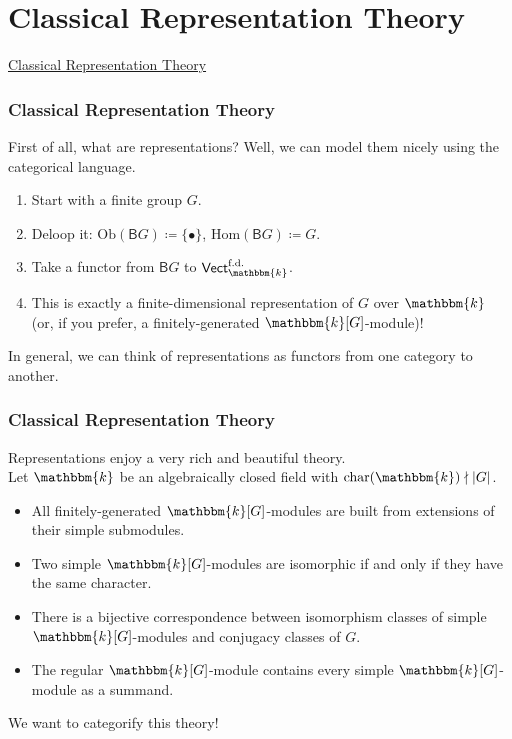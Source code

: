 \documentclass{beamer}
\DeclarePairedDelimiter{\abs}{\lvert}{\rvert}
\newcommand{\obset}{\mathrm{Ob}}
\newcommand{\homset}{\mathrm{Hom}}
\newcommand{\textcat}[1]{\mathrm{\textsf{#1}}}
\begin{document}

\section{Classical Representation Theory}

\begin{frame}
\centerline{\huge\textcolor{structure}{\underline{Classical Representation Theory}}}
\end{frame}

\begin{frame}
\frametitle{Classical Representation Theory}
First of all, what are representations? Well, we can model them nicely using the categorical language.\\[2ex]
\begin{enumerate}
\item Start with a finite group $G$.
\item Deloop it: $\obset(\textcat{B}G) \coloneqq \{\bullet\}$, $\homset(\textcat{B}G) \coloneqq G$.
\item Take a functor from $\textcat{B}G$ to $\textsf{Vect}^\text{f.d.}_\mathbbm{k}$.
\item This is exactly a finite-dimensional representation of $G$ over $\mathbbm{k}$ (or, if you prefer, a finitely-generated $\mathbbm{k}[G]$-module)!\\[2ex]
\end{enumerate}
In general, we can think of representations as functors from one category to another.
\end{frame}

\begin{frame}
\frametitle{Classical Representation Theory}
Representations enjoy a very rich and beautiful theory.\\[2ex]
Let $\mathbbm{k}$ be an algebraically closed field with $\mathrm{char}(\mathbbm{k}) \nmid \abs{G}$.\\[2ex]
\begin{itemize}
\item All finitely-generated $\mathbbm{k}[G]$-modules are built from extensions of their simple submodules.
\item Two simple $\mathbbm{k}[G]$-modules are isomorphic if and only if they have the same character.
\item There is a bijective correspondence between isomorphism classes of simple $\mathbbm{k}[G]$-modules and conjugacy classes of $G$.
\item The regular $\mathbbm{k}[G]$-module contains every simple $\mathbbm{k}[G]$-module as a summand.\\[2ex]
\end{itemize}
We want to categorify this theory!
\end{frame}
\end{document}
